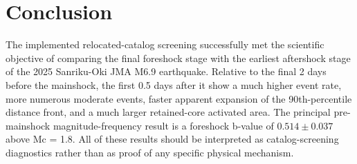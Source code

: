 \documentclass[11pt]{article}
\begin{document}
\section{Conclusion}
The implemented relocated-catalog screening successfully met the scientific objective of comparing the final foreshock stage with the earliest aftershock stage of the 2025 Sanriku-Oki JMA M6.9 earthquake. Relative to the final 2 days before the mainshock, the first 0.5 days after it show a much higher event rate, more numerous moderate events, faster apparent expansion of the 90th-percentile distance front, and a much larger retained-core activated area. The principal pre-mainshock magnitude-frequency result is a foreshock b-value of $0.514 \pm 0.037$ above Mc = 1.8. All of these results should be interpreted as catalog-screening diagnostics rather than as proof of any specific physical mechanism.
\end{document}

